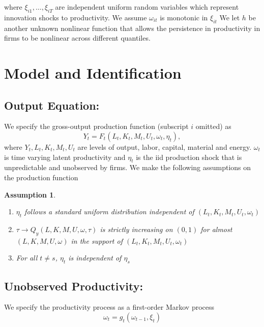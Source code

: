 \documentclass{article}
\newtheorem{assump}{Assumption}[subsection]
\begin{document}
where $\xi_{i1},\dots, \xi_{iT}$ are independent uniform random variables which represent innovation shocks to productivity. We assume $\omega_{it}$ is monotonic in $\xi_{it}$ We let $h$ be another unknown nonlinear function that allows the persistence in productivity in firms to be nonlinear across different quantiles.

\section{Model and Identification}

\subsection{Output Equation:}

\noindent We specify the gross-output production function (subscript $i$ omitted) as
\begin{equation}\label{pf}
Y_{t}=F_{t}(L_{t}, K_{t}, M_{t}, U_{t}, \omega_{t}, \eta_{t}),
\end{equation}
where $Y_{t}, L_{t}, K_{t}, M_{t}, U_{t}$ are levels of output, labor, capital, material and energy. $\omega_{t}$ is time varying latent productivity and $\eta_{t}$ is the iid production shock that is unpredictable and unobserved by firms. We make the following assumptions on the production function\\

\begin{assump}\label{as1}
~
\begin{enumerate}[label=\alph*)]
\item $\eta_{t}$ follows a standard uniform distribution independent of $(L_{t}, K_{t}, M_{t}, U_{t}, \omega_{t})$
\item $\tau \rightarrow Q_{y}(L, K, M, U,\omega, \tau)$ is strictly increasing on $(0,1)$ for almost $(L, K, M, U,\omega)$ in the support of $(L_{t}, K_{t}, M_{t}, U_{t}, \omega_{t})$
\item For all $t\neq s$, $\eta_{t}$ is independent of $\eta_{s}$
\end{enumerate}
\end{assump}


\subsection{Unobserved Productivity:}

\noindent We specify the productivity process as a first-order Markov process
\begin{equation}\label{markov}
	\omega_{t}=g_{t}(\omega_{t-1}, \xi_{t})
\end{equation}
\end{document}
